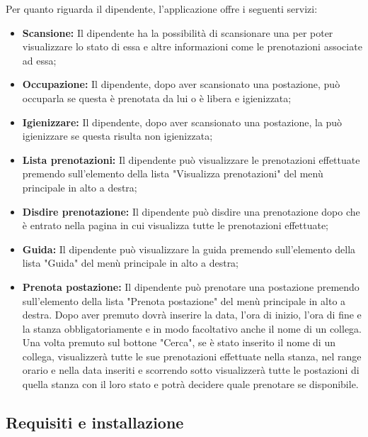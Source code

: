 Per quanto riguarda il dipendente, l'applicazione offre i seguenti servizi:
\begin{itemize}
	\item \textbf{Scansione:} Il dipendente ha la possibilità di scansionare una  per poter visualizzare lo stato di essa e altre informazioni come le prenotazioni associate ad essa; \\
	\item \textbf{Occupazione:} Il dipendente, dopo aver scansionato una postazione, può occuparla se questa è prenotata da lui o è libera e igienizzata; \\
	\item \textbf{Igienizzare:} Il dipendente, dopo aver scansionato una postazione, la può igienizzare se questa risulta non igienizzata; \\
	\item \textbf{Lista prenotazioni:} Il dipendente può visualizzare le prenotazioni effettuate premendo sull'elemento della lista "Visualizza prenotazioni" del menù principale in alto a destra; \\
	\item \textbf{Disdire prenotazione:} Il dipendente può disdire una prenotazione dopo che è entrato nella pagina in cui visualizza tutte le prenotazioni effettuate; \\
	\item \textbf{Guida:} Il dipendente può visualizzare la guida premendo sull'elemento della lista "Guida" del menù principale in alto a destra; \\
	\item \textbf{Prenota postazione:} Il dipendente può prenotare una postazione premendo sull'elemento della lista "Prenota postazione" del menù principale in alto a destra.
	Dopo aver premuto dovrà inserire la data, l'ora di inizio, l'ora di fine e la stanza obbligatoriamente e in modo facoltativo anche il nome di un collega.
	Una volta premuto sul bottone "Cerca", se è stato inserito il nome di un collega, visualizzerà tutte le sue prenotazioni effettuate nella stanza, nel range orario e nella data inseriti e scorrendo sotto visualizzerà tutte le postazioni di quella stanza con il loro stato e potrà decidere quale prenotare se disponibile. \\	
\end{itemize}




\subsection{Requisiti e installazione}

